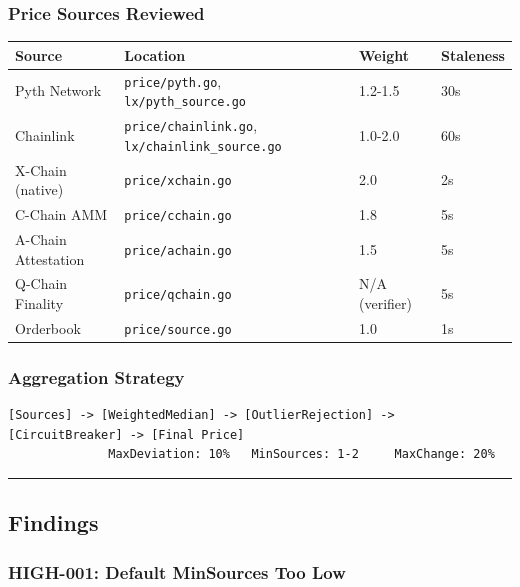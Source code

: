\documentclass[
]{article}
\newcounter{none} %
\begin{document}
\subsubsection{Price Sources Reviewed}\label{price-sources-reviewed}

{\def\LTcaptype{none} %
\begin{longtable}[]{@{}llll@{}}
\toprule\noalign{}
Source & Location & Weight & Staleness \\
\midrule\noalign{}
\endhead
\bottomrule\noalign{}
\endlastfoot
Pyth Network & \texttt{price/pyth.go}, \texttt{lx/pyth\_source.go} &
1.2-1.5 & 30s \\
Chainlink & \texttt{price/chainlink.go},
\texttt{lx/chainlink\_source.go} & 1.0-2.0 & 60s \\
X-Chain (native) & \texttt{price/xchain.go} & 2.0 & 2s \\
C-Chain AMM & \texttt{price/cchain.go} & 1.8 & 5s \\
A-Chain Attestation & \texttt{price/achain.go} & 1.5 & 5s \\
Q-Chain Finality & \texttt{price/qchain.go} & N/A (verifier) & 5s \\
Orderbook & \texttt{price/source.go} & 1.0 & 1s \\
\end{longtable}
}

\subsubsection{Aggregation Strategy}\label{aggregation-strategy}

\begin{verbatim}
[Sources] -> [WeightedMedian] -> [OutlierRejection] -> [CircuitBreaker] -> [Final Price]
              MaxDeviation: 10%   MinSources: 1-2     MaxChange: 20%
\end{verbatim}

\begin{center}\rule{0.5\linewidth}{0.5pt}\end{center}

\subsection{Findings}\label{findings}

\subsubsection{HIGH-001: Default MinSources Too
Low}\label{high-001-default-minsources-too-low}
\end{document}
